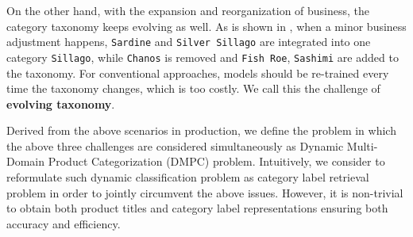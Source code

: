 On the other hand, with the expansion and reorganization of business, the category taxonomy keeps evolving as well. 
As is shown in , when a minor business adjustment happens, \verb|Sardine| and \verb|Silver Sillago| are integrated into one category \verb|Sillago|, while \verb|Chanos| is removed and \verb|Fish Roe|, \verb|Sashimi| are added to the taxonomy. 
For conventional approaches, models should be re-trained every time the taxonomy changes, which is too costly. We call this the challenge of \textbf{evolving taxonomy}.


Derived from the above scenarios in production, we define the problem in which the above three challenges are considered simultaneously as Dynamic Multi-Domain Product Categorization (DMPC) problem. 
Intuitively, we consider to reformulate such dynamic classification problem as category label retrieval problem in order to jointly circumvent the above issues. However, it is non-trivial to obtain both product titles and category label representations ensuring both accuracy and efficiency. 

